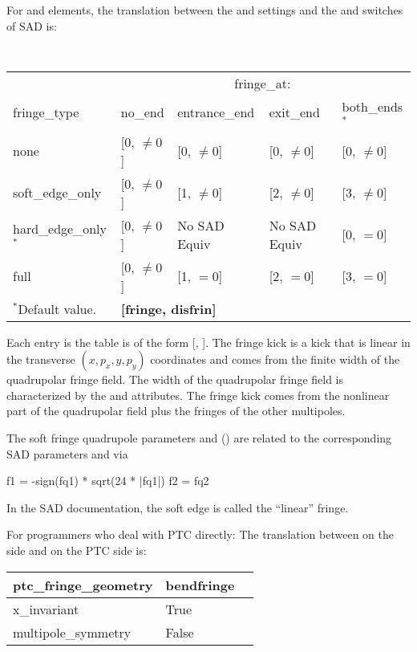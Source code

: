 {For  and  elements, the translation between the 
and  settings and the  and  switches of SAD is:
\newline\hspace*{0.1in}
{{ \tt
\begin{tabular}{lllll} 
                       & \multicolumn{4}{c}{fringe_at:}                               \\
  fringe_type          & no_end       & entrance_end   & exit_end     & both_ends$^*$ \\ \midrule
  none                 & [0, $\ne 0$] & [0, $\ne 0$]   & [0, $\ne 0$] & [0, $\ne 0$]  \\
  soft_edge_only       & [0, $\ne 0$] & [1, $\ne 0$]   & [2, $\ne 0$] & [3, $\ne 0$]  \\
  hard_edge_only$^*$   & [0, $\ne 0$] & No SAD Equiv   & No SAD Equiv & [0, $= 0$]    \\
  full                 & [0, $\ne 0$] & [1, $= 0$]     & [2, $= 0$]   & [3, $= 0$]    \\ 
  \bottomrule
  $^*$Default value.   & \multicolumn{4}{l}{\textbf{[fringe, disfrin]}} \\
\end{tabular}
\hfill\vspace*{0.1in}
}\newline}
Each entry is the table is of the form [, ]. The  fringe
kick is a kick that is linear in the transverse $(x, p_x, y, p_y)$ coordinates and comes from the
finite width of the quadrupolar fringe field. The width of the quadrupolar fringe field is
characterized by the  and  attributes. The  fringe kick comes
from the nonlinear part of the quadrupolar field plus the fringes of the other multipoles.

The soft fringe quadrupole parameters  and  () are related
to the corresponding SAD parameters  and  via
\begin{example}
  f1 = -sign(fq1) * sqrt(24 * |fq1|)
  f2 = fq2
\end{example}
In the SAD documentation, the soft edge is called the ``linear'' fringe.

For programmers who deal with PTC directly: The translation between  on the
\bmad side and  on the PTC side is:
\newline\hspace*{0.1in}
{
\begin{tabular}{lll} \toprule 
  ptc_fringe_geometry     & bendfringe \\ \midrule
  x_invariant             & True       \\
  multipole_symmetry      & False      \\ 
  \bottomrule
\end{tabular}
}

}
